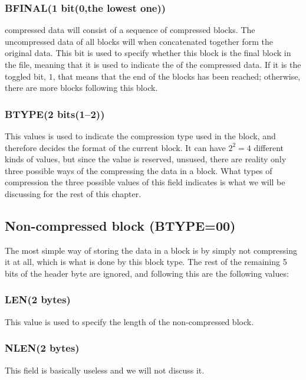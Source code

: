\subsubsection{BFINAL(1 bit(0,the lowest one))}

 compressed data will consist of a sequence of compressed
blocks. The uncompressed data of all blocks will when concatenated
together form the original data. This bit is used to specify whether
this block is the final block in the file, meaning that it is used to
indicate the of the compressed data. If it is the toggled bit, $1$,
that means that the end of the blocks has been reached; otherwise,
there are more blocks following this block.

\subsubsection{BTYPE(2 bits(1--2))}

This values is used to indicate the compression type used in the
block, and therefore decides the format of the current block. It can
have $2^2 = 4$ different kinds of values, but since the value 
is reserved, unsused, there are reality only three possible ways of
the compressing the data in a block. What types of compression the
three possible values of this field indicates is what we will be
discussing for the rest of this chapter.

\subsection{Non-compressed block (BTYPE=00)}

The most simple way of storing the data in a block is by simply not
compressing it at all, which is what is done by this block type. The
rest of the remaining 5 bits of the header byte are ignored, and
following this are the following values:

\subsubsection{LEN(2 bytes)}

This value is used to specify the length of the non-compressed block.

\subsubsection{NLEN(2 bytes)}

This field is basically useless and we will not discuss it.

